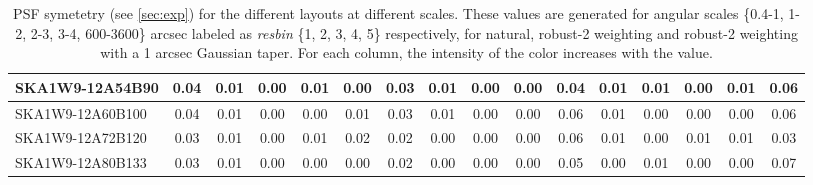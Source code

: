 \begin{table}[H]
{{\begin{tabular}{|lccccc||ccccc||ccccc|}
SKA1W9-12A54B90 & 0.04 \cellcolor{blue!60.00} & 0.01 \cellcolor{red!18.00} & 0.00 \cellcolor{green!18.00} & 0.01 \cellcolor{orange!60.00} & 0.00 \cellcolor{purple!18.00} & 0.03 \cellcolor{blue!60.00} & 0.01 \cellcolor{red!60.00} & 0.00 \cellcolor{green!18.00} & 0.00 \cellcolor{orange!18.00} & 0.04 \cellcolor{purple!32.00} & 0.01 \cellcolor{blue!39.00} & 0.01 \cellcolor{red!60.00} & 0.00 \cellcolor{green!18.00} & 0.01 \cellcolor{orange!60.00} & 0.06 \cellcolor{purple!43.20}\\ \hline 
SKA1W9-12A60B100 & 0.04 \cellcolor{blue!60.00} & 0.01 \cellcolor{red!18.00} & 0.00 \cellcolor{green!18.00} & 0.00 \cellcolor{orange!18.00} & 0.01 \cellcolor{purple!39.00} & 0.03 \cellcolor{blue!60.00} & 0.01 \cellcolor{red!60.00} & 0.00 \cellcolor{green!18.00} & 0.00 \cellcolor{orange!18.00} & 0.06 \cellcolor{purple!60.00} & 0.01 \cellcolor{blue!39.00} & 0.00 \cellcolor{red!18.00} & 0.00 \cellcolor{green!18.00} & 0.00 \cellcolor{orange!18.00} & 0.06 \cellcolor{purple!43.20}\\ \hline 
SKA1W9-12A72B120 & 0.03 \cellcolor{blue!18.00} & 0.01 \cellcolor{red!18.00} & 0.00 \cellcolor{green!18.00} & 0.01 \cellcolor{orange!60.00} & 0.02 \cellcolor{purple!60.00} & 0.02 \cellcolor{blue!18.00} & 0.00 \cellcolor{red!18.00} & 0.00 \cellcolor{green!18.00} & 0.00 \cellcolor{orange!18.00} & 0.06 \cellcolor{purple!60.00} & 0.01 \cellcolor{blue!39.00} & 0.00 \cellcolor{red!18.00} & 0.01 \cellcolor{green!60.00} & 0.01 \cellcolor{orange!60.00} & 0.03 \cellcolor{purple!18.00}\\ \hline 
SKA1W9-12A80B133 & 0.03 \cellcolor{blue!18.00} & 0.01 \cellcolor{red!18.00} & 0.00 \cellcolor{green!18.00} & 0.00 \cellcolor{orange!18.00} & 0.00 \cellcolor{purple!18.00} & 0.02 \cellcolor{blue!18.00} & 0.00 \cellcolor{red!18.00} & 0.00 \cellcolor{green!18.00} & 0.00 \cellcolor{orange!18.00} & 0.05 \cellcolor{purple!46.00} & 0.00 \cellcolor{blue!18.00} & 0.01 \cellcolor{red!60.00} & 0.00 \cellcolor{green!18.00} & 0.00 \cellcolor{orange!18.00} & 0.07 \cellcolor{purple!51.60}\\ \hline 
\end{tabular}}
\vspace{-0.300000cm}
\hspace{1cm} 

\vspace{.50cm}
\caption{PSF symetetry (see \autoref{sec:exp})  for the different layouts at different scales. These values are generated for angular scales \{0.4-1, 1-2, 2-3, 3-4, 600-3600\} arcsec labeled as {\it resbin} \{1, 2, 3, 4, 5\} respectively, for natural, robust-2 weighting and robust-2 weighting with a 1 arcsec Gaussian taper. For each column, the intensity of the color increases with the value.}\label{tab:psf_sym}}
 \end{table}
